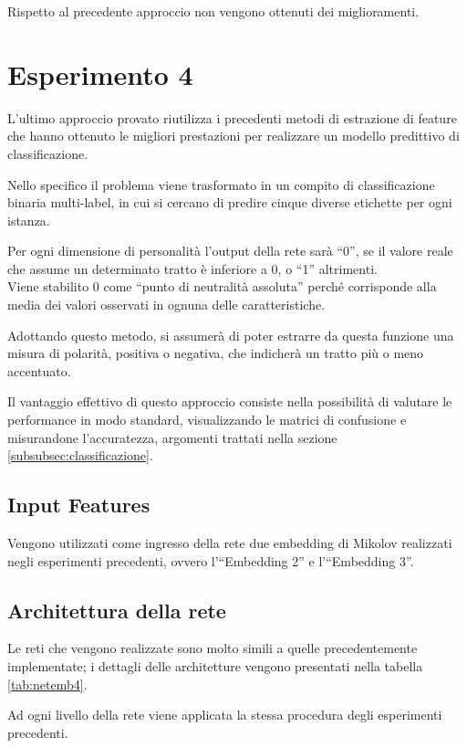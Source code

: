 Rispetto al precedente approccio non vengono ottenuti dei miglioramenti. 

\section{Esperimento 4}
\label{sec:es4}

L'ultimo approccio provato riutilizza i precedenti metodi di estrazione di feature che hanno ottenuto le migliori prestazioni per realizzare un modello predittivo di classificazione.

Nello specifico il problema viene trasformato in un compito di classificazione binaria multi-label, in cui si cercano di predire cinque diverse etichette per ogni istanza. 

Per ogni dimensione di personalità l'output della rete sarà ``0'', se il valore reale che assume un determinato tratto è inferiore a 0, o ``1'' altrimenti.
\\
Viene stabilito 0 come ``punto di neutralità assoluta'' perché corrisponde alla media dei valori osservati in ognuna delle caratteristiche.

Adottando questo metodo, si assumerà di poter estrarre da questa funzione una misura di polarità, positiva o negativa, che indicherà un tratto più o meno accentuato.

Il vantaggio effettivo di questo approccio consiste nella possibilità di valutare le performance in modo standard, visualizzando le matrici di confusione e misurandone l'accuratezza, argomenti trattati nella sezione \ref{subsubsec:classificazione}.

\subsection{Input Features}
\label{subsec:features4}

Vengono utilizzati come ingresso della rete due embedding di Mikolov realizzati negli esperimenti precedenti, ovvero l'``Embedding 2'' e l'``Embedding 3''.

\subsection{Architettura della rete}
\label{subsec:modelli4}

Le reti che vengono realizzate sono molto simili a quelle precedentemente implementate; i dettagli delle architetture vengono presentati nella tabella \ref{tab:netemb4}.

Ad ogni livello della rete viene applicata la stessa procedura degli esperimenti precedenti. 

